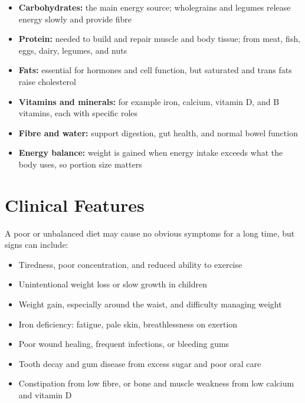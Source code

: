 \begin{itemize}
    \item \textbf{Carbohydrates:} the main energy source; wholegrains and legumes release energy slowly and provide fibre
    \item \textbf{Protein:} needed to build and repair muscle and body tissue; from meat, fish, eggs, dairy, legumes, and nuts
    \item \textbf{Fats:} essential for hormones and cell function, but saturated and trans fats raise cholesterol
    \item \textbf{Vitamins and minerals:} for example iron, calcium, vitamin D, and B vitamins, each with specific roles
    \item \textbf{Fibre and water:} support digestion, gut health, and normal bowel function
    \item \textbf{Energy balance:} weight is gained when energy intake exceeds what the body uses, so portion size matters
\end{itemize}

\section*{Clinical Features}
A poor or unbalanced diet may cause no obvious symptoms for a long time, but signs can include:

\begin{itemize}
    \item Tiredness, poor concentration, and reduced ability to exercise
    \item Unintentional weight loss or slow growth in children
    \item Weight gain, especially around the waist, and difficulty managing weight
    \item Iron deficiency: fatigue, pale skin, breathlessness on exertion
    \item Poor wound healing, frequent infections, or bleeding gums
    \item Tooth decay and gum disease from excess sugar and poor oral care
    \item Constipation from low fibre, or bone and muscle weakness from low calcium and vitamin D
\end{itemize}

